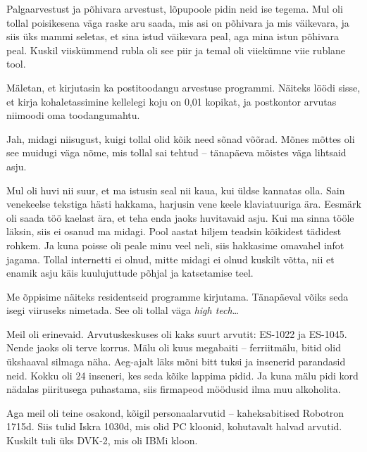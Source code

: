 
Palgaarvestust ja põhivara 
arvestust, lõpupoole pidin neid ise tegema. Mul oli tollal poisikesena väga raske aru saada, mis asi on 
põhivara ja mis väikevara, ja siis üks mammi seletas, et sina 
istud väikevara peal, aga mina istun põhivara peal. Kuskil viiskümmend 
rubla oli see piir ja temal oli viiekümne viie rublane tool. 

Mäletan, et kirjutasin ka postitoodangu arvestuse programmi. Näiteks löödi sisse, et kirja kohaletassimine kellelegi koju on 0,01 kopikat, ja 
postkontor arvutas niimoodi oma toodangumahtu. 


Jah, midagi niisugust, kuigi tollal olid kõik need sõnad võõrad. Mõnes mõttes oli see muidugi väga nõme, mis tollal sai tehtud -- tänapäeva mõistes väga lihtsaid asju. 


Mul oli huvi nii suur, et ma istusin seal nii kaua, kui üldse kannatas olla. Sain venekeelse tekstiga hästi hakkama, harjusin vene keele klaviatuuriga ära. Eesmärk oli saada töö kaelast ära, et teha enda jaoks huvitavaid asju. Kui ma sinna tööle läksin, siis ei osanud ma midagi. Pool aastat hiljem teadsin kõikidest tädidest rohkem. Ja kuna poisse oli peale minu veel neli, siis hakkasime omavahel infot jagama. Tollal internetti ei olnud, mitte midagi ei olnud kuskilt võtta, nii et enamik asju käis kuulujuttude põhjal ja katsetamise teel. 

Me õppisime näiteks residentseid programme kirjutama. Tänapäeval võiks seda 
isegi viiruseks nimetada. See oli tollal väga \emph{high tech}\ldots


Meil oli erinevaid. Arvutuskeskuses oli kaks suurt arvutit: ES-1022 ja ES-1045. Nende jaoks oli terve korrus. Mälu oli kuus megabaiti -- ferriitmälu, bitid olid ükshaaval 
silmaga näha. Aeg-ajalt läks mõni bitt tuksi ja insenerid parandasid neid. 
Kokku oli 24 inseneri, kes seda kõike lappima pidid. Ja kuna mälu 
pidi kord nädalas piiritusega puhastama, siis firmapeod möödusid ilma muu 
alkoholita.

Aga meil oli teine osakond, kõigil personaalarvutid -- 
kaheksabitised Robotron 1715d. Siis tulid 
Iskra 1030d, mis olid PC kloonid, kohutavalt halvad 
arvutid. Kuskilt tuli üks DVK-2, mis oli IBMi kloon. 

